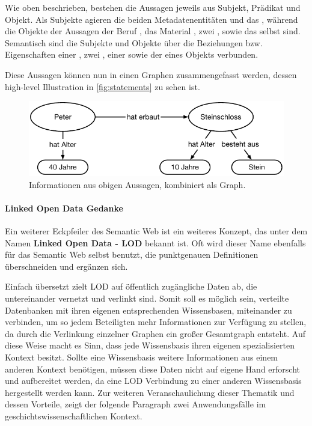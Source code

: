 Wie oben beschrieben, bestehen die Aussagen jeweils aus Subjekt, Prädikat und Objekt. Als Subjekte agieren die beiden Metadatenentitäten  und das , während die Objekte der Aussagen der Beruf , das Material , zwei , sowie das  selbst sind. Semantisch sind die Subjekte und Objekte über die Beziehungen bzw. Eigenschaften einer , zwei , einer  sowie der  eines Objekts verbunden.

Diese Aussagen können nun in einen Graphen zusammengefasst werden, dessen high-level Illustration in \autoref{fig:statements} zu sehen ist.

\begin{figure}[htb]
    \centering
    \includegraphics[width=\textwidth]{Figures/berndl/statements}
    \caption{\label{fig:statements} Informationen aus obigen Aussagen, kombiniert als Graph.}
\end{figure}

\paragraph{Linked Open Data Gedanke}

Ein weiterer Eckpfeiler des Semantic Web ist ein weiteres Konzept, das unter dem Namen \textbf{Linked Open Data - LOD} bekannt ist. Oft wird dieser Name ebenfalls für das Semantic Web selbst benutzt, die punktgenauen Definitionen überschneiden und ergänzen sich.

Einfach übersetzt zielt LOD auf öffentlich zugängliche Daten ab, die untereinander vernetzt und verlinkt sind. Somit soll es möglich sein, verteilte Datenbanken mit ihren eigenen entsprechenden Wissensbasen, miteinander zu verbinden, um so jedem Beteiligten mehr Informationen zur Verfügung zu stellen, da durch die Verlinkung einzelner Graphen ein großer Gesamtgraph entsteht. Auf diese Weise macht es Sinn, dass jede Wissensbasis ihren eigenen spezialisierten Kontext besitzt. Sollte eine Wissensbasis weitere Informationen aus einem anderen Kontext benötigen, müssen diese Daten nicht auf eigene Hand erforscht und aufbereitet werden, da eine LOD Verbindung zu einer anderen Wissensbasis hergestellt werden kann. Zur weiteren Veranschaulichung dieser Thematik und dessen Vorteile, zeigt der folgende Paragraph zwei Anwendungsfälle im geschichtswissenschaftlichen Kontext.

